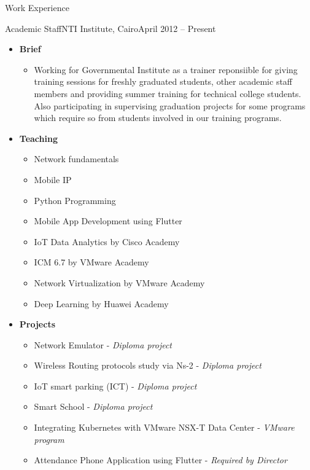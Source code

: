 \documentclass[]{mcdowellcv}
\begin{document}
	\begin{cvsection}{Work Experience}
		\begin{cvsubsection}{Academic Staff}{NTI Institute, Cairo}{April 2012 – Present}
			\begin{itemize}
				\item \textbf{Brief}
				\begin{itemize}
					\item Working for Governmental Institute as a trainer reponsiible for giving training sessions for freshly graduated students, other academic staff members and providing summer training for technical college students. Also participating in supervising graduation projects for some programs which require so from students involved in our training programs.
				\end{itemize}
                           \end{itemize}
			\begin{itemize}
				\item \textbf{Teaching}
				\begin{itemize}
					\item Network fundamentals
					\item Mobile IP
					\item Python Programming
					\item Mobile App Development using Flutter
					\item IoT Data Analytics by Cisco Academy
					\item ICM 6.7 by VMware Academy
					\item Network Virtualization by VMware Academy
					\item Deep Learning by Huawei Academy
				\end{itemize}
				\item \textbf{Projects}
				\begin{itemize}
					\item Network Emulator - \textit{Diploma project}
					\item Wireless Routing protocols study via Ns-2 - \textit{Diploma project}
					\item IoT smart parking (ICT) - \textit{Diploma project}
					\item Smart School - \textit{Diploma project}
					\item Integrating Kubernetes with VMware NSX-T Data Center - \textit{VMware program}
					\item Attendance Phone Application using Flutter - \textit{Required by Director}
				\end{itemize}
			\end{itemize}
			
		\end{cvsubsection}
		
	\end{cvsection}
	
\end{document}
